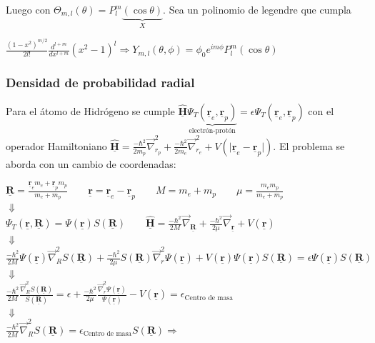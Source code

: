 \documentclass[oneside]{book}
\numberwithin{equation}{section}
\numberwithin{figure}{section}
\numberwithin{table}{section}
\newcommand{\vect}[1]{\underline{\textbf{#1}}}
\begin{document}
					Luego con $\Theta_{m,l} (\theta)=P_l^m \underbrace{\left( \cos \theta \right)}_X$. Sea un polinomio de legendre que cumpla\\
					 
					\begin{center}
						$\frac{(1-x^2)^{m/2}}{2l!}\frac{d^{l+m}}{d x^{l+m}}(x^2-1)^l \Rightarrow Y_{m,l}(\theta,\phi)=\phi_0 e^{i m \phi}P_l^m(\cos \theta)$
					\end{center}				
					
				\subsubsection{Densidad de probabilidad radial}
					
					Para el átomo de Hidrógeno se cumple $\hat{\vect{H}} \underbrace{\Psi_T (\vect{r}_e,\vect{r}_p)}_{\text{electrón-protón}}=\epsilon \Psi_T (\vect{r}_e,\vect{r}_p)$ con el operador Hamiltoniano $\hat{\vect{H}}=\frac{-\hbar^2}{2 m_p}\vec{\nabla}_{r_p}^2+\frac{-\hbar^2}{2 m_e}\vec{\nabla}_{r_e}^2+V(\vert \vect{r}_e-\vect{r}_p \vert)$. El problema se aborda con un cambio de coordenadas:\\
					
					\begin{center}
						$\vect{R}=\frac{\vect{r}_e m_e+\vect{r}_p m_p}{m_e+m_p} \qquad \vect{r}=\vect{r}_e-\vect{r}_p \qquad M=m_e+m_p \qquad \mu=\frac{m_e m_p}{m_e+m_p}$\\
						
						$\Downarrow$\\
						
						$\Psi_T(\vect{r},\vect{R})=\Psi(\vect{r}) S(\vect{R}) \qquad \hat{\vect{H}}=\frac{-\hbar^2}{2M}\vec{\nabla}_{\vect{R}}+\frac{-\hbar^2}{2 \mu}\vec{\nabla}_{\vect{r}}+V(\vect{r})$\\
						
						$\Downarrow$\\
						
						$\frac{-\hbar^2}{2M}\Psi(\vect{r})\vec{\nabla}_R^2 S(\vect{R})+\frac{-\hbar^2}{2\mu}S(\vect{R})\vec{\nabla}_r^2\Psi(\vect{r})+V(\vect{r})\Psi(\vect{r}) S(\vect{R})=\epsilon\Psi(\vect{r}) S(\vect{R})$\\
						
						$\Downarrow$\\
						
						$\frac{-\hbar^2}{2M}\frac{\vec{\nabla}_R^2S(\vect{R})}{S(\vect{R})}=\epsilon+\frac{-\hbar^2}{2\mu}\frac{\vec{\nabla}_r^2\Psi(\vect{r})}{\Psi(\vect{r})}-V(\vect{r})=\epsilon_{\text{Centro de masa}}$\\
						
						$\Downarrow$\\
						
						$\frac{-\hbar^2}{2M}\vec{\nabla}_R^2S(\vect{R})=\epsilon_{\text{Centro de masa}} S(\vect{R}) \Rightarrow$ \boxed{S(\vect{R})=cte \cdot e^{i \vect{K} \cdot \vect{R}}}
					\end{center}
					
\end{document}

